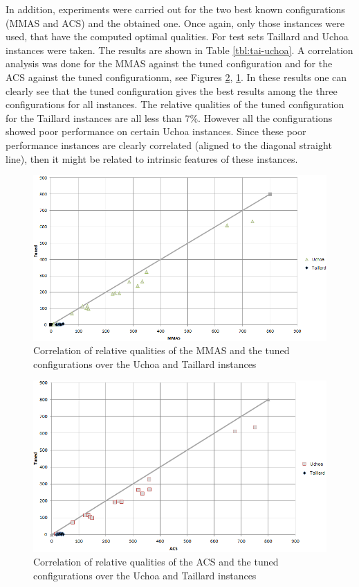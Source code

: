 \documentclass[12pt,a4paper,oneside]{book}
\begin{document}
In addition, experiments were carried out for the two best known configurations (MMAS and ACS) and the obtained one. Once again, only those instances were used, that have the computed optimal qualities. For test sets Taillard and Uchoa instances were taken. The results are shown in Table \ref{tbl:tai-uchoa}. A correlation analysis was done for the MMAS against the tuned configuration and for the ACS against the tuned configurationm, see Figures \ref{fig:acs-tuned}, \ref{fig:mmas-tuned}. In these results one can clearly see that the tuned configuration gives the best results among the three configurations for all instances. The relative qualities of the tuned configuration for the Taillard instances are all less than 7\%. However all the configurations showed poor performance on certain Uchoa instances. Since these poor performance instances are clearly correlated (aligned to the diagonal straight line), then it might be related to intrinsic features of these instances. 

\begin{figure}[h]
  \centering
    \includegraphics[scale=0.75]{mmas-tuned.PNG}
  \caption{Correlation of relative qualities of the MMAS and the tuned configurations over the Uchoa and Taillard instances}
  \label{fig:mmas-tuned}
\end{figure}

\begin{figure}[h]
  \centering
    \includegraphics[scale=0.75]{acs-tuned.PNG}
  \caption{Correlation of relative qualities of the ACS and the tuned configurations over the Uchoa and Taillard instances}
  \label{fig:acs-tuned}
\end{figure}
\end{document}
